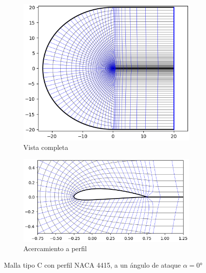 \documentclass[letterpaper, openright, 12pt]{book}
\begin{document}
    \begin{figure}[htbp!]
        \centering
        \begin{subfigure}[c]{0.45\textwidth}
            \includegraphics[keepaspectratio,
                width=0.99\textwidth]{./img/naca4415_c_far}
            \caption{Vista completa}
            \label{fig:naca4415_c_far}
        \end{subfigure}
        \hfill
        \begin{subfigure}[c]{0.45\textwidth}
            \includegraphics[keepaspectratio,
                width=0.99\textwidth]{./img/naca4415_c_close}
            \caption{Acercamiento a perfil}
            \label{fig:naca4415_c_close}
        \end{subfigure}
        \caption[Malla tipo C con perfil NACA 4415]{Malla tipo C con perfil
            NACA 4415, a un ángulo de ataque $\alpha = 0\si{\degree}$}
        \label{fig:naca4415_c}
    \end{figure}
\end{document}
